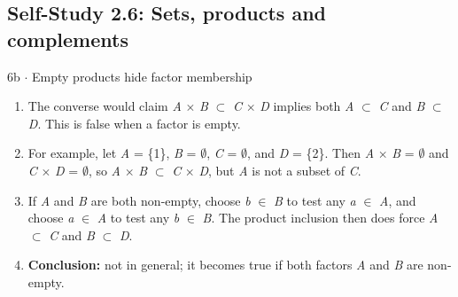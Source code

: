 \documentclass[11pt]{article}
\begin{document}
\begin{keepsection}\subsection{Self-Study 2.6: Sets, products and complements}

\begin{workedbox}{6b \ensuremath{\cdot} Empty products hide factor membership}
\begin{enumerate}
\item The converse would claim \textit{A} \ensuremath{\times} \textit{B} \ensuremath{\subset} \textit{C} \ensuremath{\times} \textit{D} implies both \textit{A} \ensuremath{\subset} \textit{C} and \textit{B} \ensuremath{\subset} \textit{D}. This is false when a factor is empty.
\item For example, let \textit{A} = \{1\}, \textit{B} = \ensuremath{\emptyset}, \textit{C} = \ensuremath{\emptyset}, and \textit{D} = \{2\}. Then \textit{A} \ensuremath{\times} \textit{B} = \ensuremath{\emptyset} and \textit{C} \ensuremath{\times} \textit{D} = \ensuremath{\emptyset}, so \textit{A} \ensuremath{\times} \textit{B} \ensuremath{\subset} \textit{C} \ensuremath{\times} \textit{D}, but \textit{A} is not a subset of \textit{C}.
\item If \textit{A} and \textit{B} are both non-empty, choose \textit{b} \ensuremath{\in} \textit{B} to test any \textit{a} \ensuremath{\in} \textit{A}, and choose \textit{a} \ensuremath{\in} \textit{A} to test any \textit{b} \ensuremath{\in} \textit{B}. The product inclusion then does force \textit{A} \ensuremath{\subset} \textit{C} and \textit{B} \ensuremath{\subset} \textit{D}.
\item \textbf{Conclusion:} not in general; it becomes true if both factors \textit{A} and \textit{B} are non-empty.
\end{enumerate}
\end{workedbox}

\end{keepsection}
\end{document}
